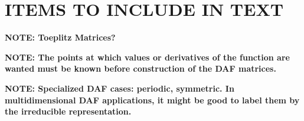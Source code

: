 \documentclass[preprint]{revtex4}
\begin{document}
\section{ITEMS TO INCLUDE IN TEXT}
{\bf NOTE: Toeplitz Matrices?}

{\bf NOTE: The points at which values or derivatives of the function are wanted must be known
before construction of the DAF matrices. }

{\bf NOTE: Specialized DAF cases: periodic, symmetric. In multidimensional DAF applications, 
it might be good to label them by the irreducible representation.}

\appendix






\end{document}
